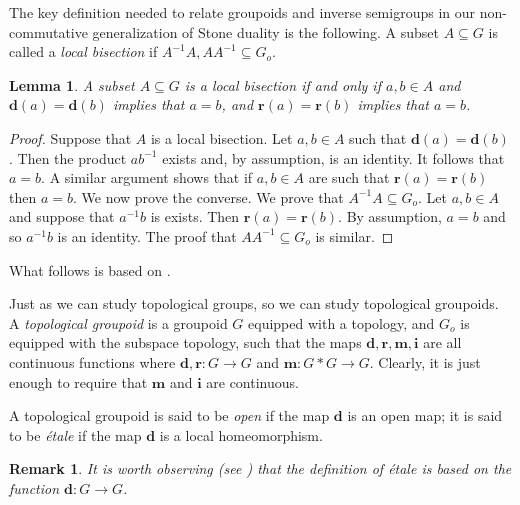 \documentclass[a4paper]{amsart}
\newtheorem{lemma}[theorem]{Lemma}
\newtheorem{remark}[theorem]{Remark}
\begin{document}
The key definition needed to relate groupoids and inverse semigroups in our non-commutative generalization of Stone duality is the following.
A subset $A \subseteq G$ is called a {\em local bisection} if $A^{-1}A,AA^{-1} \subseteq G_{o}$.

\begin{lemma}\label{lem:water} 
A subset $A \subseteq G$ is a local bisection if and only if $a,b \in A$ and $\mathbf{d}(a) = \mathbf{d}(b)$ implies that $a = b$,
and $\mathbf{r}(a) = \mathbf{r}(b)$ implies that $a = b$.
\end{lemma}
\begin{proof} Suppose that $A$ is a local bisection.
Let $a,b \in A$ such that $\mathbf{d}(a) = \mathbf{d}(b)$.
Then the product $ab^{-1}$ exists and, by assumption, is an identity.
It follows that $a = b$.
A similar argument shows that if $a,b \in A$ are such that $\mathbf{r}(a) = \mathbf{r}(b)$
then $a = b$.
We now prove the converse.
We prove that $A^{-1}A \subseteq G_{o}$.
Let $a,b \in A$ and suppose that $a^{-1}b$ is exists.
Then $\mathbf{r}(a) = \mathbf{r}(b)$.
By assumption, $a = b$ and so $a^{-1}b$ is an identity.
The proof that $AA^{-1} \subseteq G_{o}$ is similar.
\end{proof}


What follows is based on \cite{Resende, Sims}.

Just as we can study topological groups, so we can study topological groupoids.
A {\em topological groupoid} is a groupoid $G$ equipped with a topology, and $G_{o}$ is equipped with the subspace topology, 
such that the maps $\mathbf{d}, \mathbf{r}, \mathbf{m}, \mathbf{i}$ are all continuous functions
where $\mathbf{d}, \mathbf{r} \colon G \rightarrow G$ and $\mathbf{m} \colon G \ast G \rightarrow G$.
Clearly, it is just enough to require that $\mathbf{m}$ and $\mathbf{i}$ are continuous.

A topological groupoid is said to be {\em open} if the map $\mathbf{d}$ is an open map;
it is said to be {\em \'etale} if the map $\mathbf{d}$ is a local homeomorphism.

\begin{remark}{\em It is worth observing (see \cite[page~12]{Sims}) that
the definition of \'etale is based on the function $\mathbf{d} \colon G \rightarrow G$.}
\end{remark}

\end{document}
